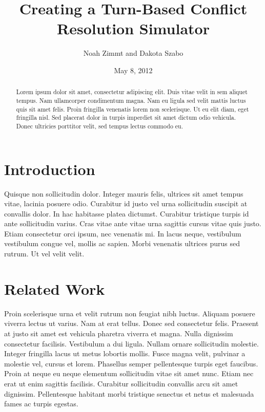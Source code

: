 \documentclass[10pt]{article}
\title{
	\textbf{
		Creating a Turn-Based Conflict Resolution Simulator
	}
}
\author{Noah Zimmt and Dakota Szabo}
\date{May 8, 2012}
\begin{document}
	\maketitle
	\begin{abstract}
		Lorem ipsum dolor sit amet, consectetur adipiscing elit. Duis vitae velit in sem aliquet tempus. Nam ullamcorper condimentum magna. Nam eu ligula sed velit mattis luctus quis sit amet felis. Proin fringilla venenatis lorem non scelerisque. Ut eu elit diam, eget fringilla nisl. Sed placerat dolor in turpis imperdiet sit amet dictum odio vehicula. Donec ultricies porttitor velit, sed tempus lectus commodo eu.
	\end{abstract}

	\begin{multicols}{2}
		\section{Introduction}
		Quisque non sollicitudin dolor. Integer mauris felis, ultrices sit amet tempus vitae, lacinia posuere odio. Curabitur id justo vel urna sollicitudin suscipit at convallis dolor. In hac habitasse platea dictumst. Curabitur tristique turpis id ante sollicitudin varius. Cras vitae ante vitae urna sagittis cursus vitae quis justo. Etiam consectetur orci ipsum, nec venenatis mi. In lacus neque, vestibulum vestibulum congue vel, mollis ac sapien. Morbi venenatis ultrices purus sed rutrum. Ut vel velit velit.

		\section{Related Work}
		Proin scelerisque urna et velit rutrum non feugiat nibh luctus. Aliquam posuere viverra lectus ut varius. Nam at erat tellus. Donec sed consectetur felis. Praesent at justo sit amet est vehicula pharetra viverra et magna. Nulla dignissim consectetur facilisis. Vestibulum a dui ligula. Nullam ornare sollicitudin molestie. Integer fringilla lacus ut metus lobortis mollis. Fusce magna velit, pulvinar a molestie vel, cursus et lorem. Phasellus semper pellentesque turpis eget faucibus. Proin at neque eu neque elementum sollicitudin vitae sit amet nunc. Etiam nec erat ut enim sagittis facilisis. Curabitur sollicitudin convallis arcu sit amet dignissim. Pellentesque habitant morbi tristique senectus et netus et malesuada fames ac turpis egestas.
		

\end{multicols}
\end{document}
